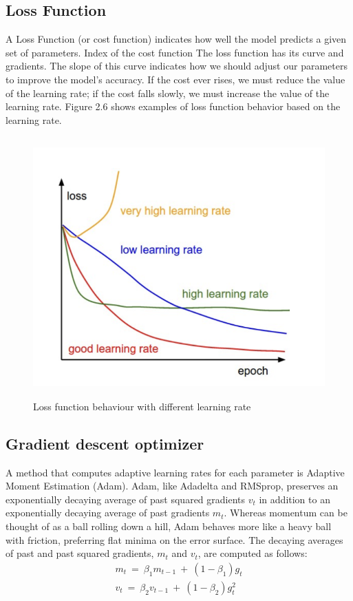 \subsection{Loss Function}
\label{subsec:loss_function}
A Loss Function (or cost function) indicates how well the model predicts a given set of parameters. Index of the cost function The loss function has its curve and gradients. The slope of this curve indicates how we should adjust our parameters to improve the model's accuracy. If the cost ever rises, we must reduce the value of the learning rate; if the cost falls slowly, we must increase the value of the learning rate. Figure 2.6 shows examples of loss function behavior based on the learning rate.
\begin{figure}[!h]
	\centering
	\includegraphics[width=\linewidth, height=10cm,keepaspectratio]{figures/loss function DL.png}
   \caption{Loss function behaviour with different learning rate}
\end{figure}

\subsection{Gradient descent optimizer}
\label{gradient_optimizer}
A method that computes adaptive learning rates for each parameter is Adaptive Moment Estimation (Adam). Adam, like Adadelta and RMSprop, preserves an exponentially decaying average of past squared gradients $v_t$ in addition to an exponentially decaying average of past gradients $m_t$. Whereas momentum can be thought of as a ball rolling down a hill, Adam behaves more like a heavy ball with friction, preferring flat minima on the error surface. The decaying averages of past and past squared gradients, $m_t$ and $v_t$, are computed as follows:
\begin{align}
    m_t \: = \: \beta_1 m_{t-1} \: + \: (1-\beta_1)g_{t}\\
    v_t \: = \: \beta_2 v_{t-1} \: + \: (1-\beta_2)g^2_t
\end{align}


